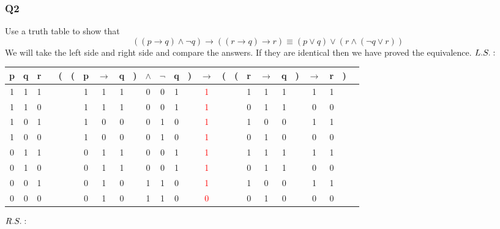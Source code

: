 \documentclass{article}
\begin{document}
\subsubsection{Q2}
Use a truth table to show that
    \[((p \rightarrow q) \land \lnot q) \rightarrow ((r \rightarrow q) \rightarrow r) \equiv (p \lor q) \lor (r \land (\lnot q \lor r))\]
    We will take the left side and right side and compare the answers. If they are identical then we have proved the equivalence.
$\\L.S.:\\$
\begin{tabular}{@{ }c@{ }@{ }c@{ }@{ }c | c@{ }@{}c@{}@{}c@{}@{ }c@{ }@{ }c@{ }@{ }c@{ }@{}c@{}@{ }c@{ }@{ }c@{ }@{ }c@{ }@{}c@{}@{ }c@{ }@{}c@{}@{}c@{}@{ }c@{ }@{ }c@{ }@{ }c@{ }@{}c@{}@{ }c@{ }@{ }c@{ }@{}c@{}@{ }c}
p & q & r &  & ( & ( & p & $\rightarrow$ & q & ) & $\land$ & $\lnot$ & q & ) & $\rightarrow$ & ( & ( & r & $\rightarrow$ & q & ) & $\rightarrow$ & r & ) & \\
\hline 
1 & 1 & 1 &  &  &  & 1 & 1 & 1 &  & 0 & 0 & 1 &  & \textcolor{red}{1} &  &  & 1 & 1 & 1 &  & 1 & 1 &  & \\
1 & 1 & 0 &  &  &  & 1 & 1 & 1 &  & 0 & 0 & 1 &  & \textcolor{red}{1} &  &  & 0 & 1 & 1 &  & 0 & 0 &  & \\
1 & 0 & 1 &  &  &  & 1 & 0 & 0 &  & 0 & 1 & 0 &  & \textcolor{red}{1} &  &  & 1 & 0 & 0 &  & 1 & 1 &  & \\
1 & 0 & 0 &  &  &  & 1 & 0 & 0 &  & 0 & 1 & 0 &  & \textcolor{red}{1} &  &  & 0 & 1 & 0 &  & 0 & 0 &  & \\
0 & 1 & 1 &  &  &  & 0 & 1 & 1 &  & 0 & 0 & 1 &  & \textcolor{red}{1} &  &  & 1 & 1 & 1 &  & 1 & 1 &  & \\
0 & 1 & 0 &  &  &  & 0 & 1 & 1 &  & 0 & 0 & 1 &  & \textcolor{red}{1} &  &  & 0 & 1 & 1 &  & 0 & 0 &  & \\
0 & 0 & 1 &  &  &  & 0 & 1 & 0 &  & 1 & 1 & 0 &  & \textcolor{red}{1} &  &  & 1 & 0 & 0 &  & 1 & 1 &  & \\
0 & 0 & 0 &  &  &  & 0 & 1 & 0 &  & 1 & 1 & 0 &  & \textcolor{red}{0} &  &  & 0 & 1 & 0 &  & 0 & 0 &  & \\
\end{tabular}
$\\R.S.:\\$
\end{document}

